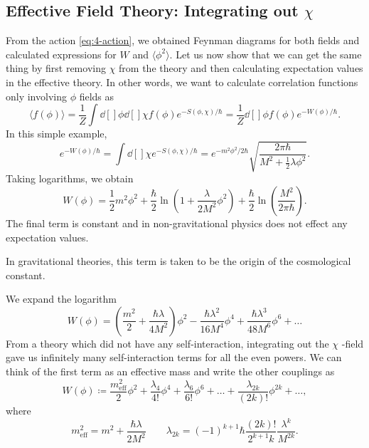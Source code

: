 
\subsection{Effective Field Theory: Integrating out \texorpdfstring{$\chi$}{a massive field}}%
\label{sub:integrating_out_chi}

From the action \eqref{eq:4-action}, we obtained Feynman diagrams for both fields and calculated expressions for $W$ and $\langle \phi^2 \rangle$.
Let us now show that we can get the same thing by first removing $\chi$ from the theory and then calculating expectation values in the effective theory.
In other words, we want to calculate correlation functions only involving $\phi$ fields as
\begin{equation}
  \langle f(\phi) \rangle = \frac{1}{Z} \int \dd[]{\phi} \dd[]{\chi} f(\phi) e^{-S(\phi, \chi) / \hbar} = \frac{1}{Z} \dd[]{\phi} f(\phi) e^{-W(\phi) / \hbar}.
\end{equation}
In this simple example, 
\begin{equation}
  e^{-W(\phi) / \hbar} = \int \dd[]{\chi} e^{-S(\phi, \chi) / \hbar} = e^{-m^2 \phi^2 / 2 \hbar} \sqrt{\frac{2 \pi \hbar}{M^2 + \frac{1}{2} \lambda \phi^2}}.
\end{equation}
Taking logarithms, we obtain
\begin{equation}
  W(\phi) = \frac{1}{2} m^2 \phi^2 + \frac{\hbar}{2} \ln(1 + \frac{\lambda}{2 M^2} \phi^2) + \frac{\hbar}{2} \ln(\frac{M^2}{2 \pi \hbar}).
\end{equation}
The final term is constant and in non-gravitational physics does not effect any expectation values.
\begin{leftbar}
  In gravitational theories, this term is taken to be the origin of the cosmological constant.
\end{leftbar}
We expand the logarithm
\begin{equation}
  W(\phi) = \left( \frac{m^2}{2} + \frac{\hbar\lambda}{4 M^2}\right) \phi^2 - \frac{\hbar \lambda^2}{16 M^4} \phi^4 + \frac{\hbar \lambda^3}{48 M^6} \phi^6 + \dots
\end{equation}
From a theory which did not have any self-interaction, integrating out the $\chi$ -field gave us infinitely many self-interaction terms for all the even powers.
We can think of the first term as an effective mass and write the other couplings as
\begin{equation}
  W(\phi) \coloneqq \frac{m_{\text{eff}}^2}{2} \phi^2 + \frac{\lambda_4}{4!} \phi^4 + \frac{\lambda_6}{6!} \phi^6 + \dots + \frac{\lambda_{2k}}{(2k)!} \phi^{2k} + \dots,
\end{equation}
where 
 \begin{equation}
  m_{\text{eff}}^2 = m^2 + \frac{\hbar \lambda}{2 M^2} \qquad 
  \lambda_{2k} = (-1)^{k +1} \hbar \frac{(2k)!}{2^{k+1} k} \frac{\lambda^k}{M^{2k}}.
\end{equation}

